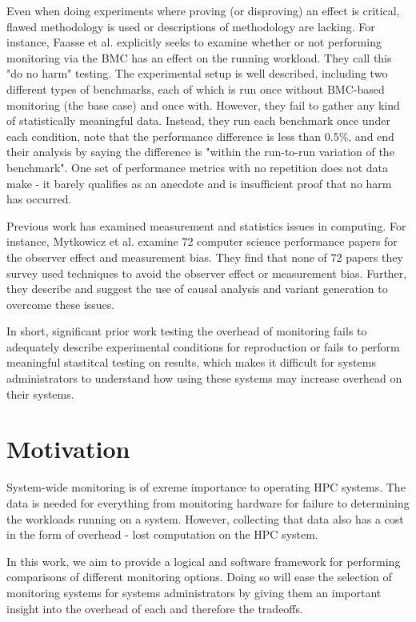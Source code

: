 \documentclass[conference]{IEEEtran}
\begin{document}
Even when doing experiments where proving (or disproving) an effect is critical, 
flawed methodology is used or descriptions of methodology are lacking. For 
instance, Faasse et al. \cite{faasseOutBandPerformance2020} explicitly seeks to examine 
whether or not performing monitoring via the BMC has an effect on the running 
workload. They call this "do no harm" testing. The experimental setup is well
described, including two different types of benchmarks, each of which is run 
once without BMC-based monitoring (the base case) and once with. However, they 
fail to gather any kind of statistically meaningful data. Instead, they run 
each benchmark once under each condition, note that the performance difference 
is less than 0.5\%, and end their analysis by saying the difference is
"within the run-to-run variation of the benchmark". One set of performance 
metrics with no repetition does not data make - it barely qualifies as an 
anecdote and is insufficient proof that no harm has occurred.

Previous work has examined measurement and statistics issues in computing. For 
instance, Mytkowicz et al. \cite{mytkowiczObserverEffectMeasurement2008} examine
72 computer science performance papers for the observer effect and measurement bias.
They find that none of 72 papers they survey used techniques to avoid the observer 
effect or measurement bias. Further, they describe and suggest the use of causal
analysis and variant generation to overcome these issues.

In short, significant prior work testing the overhead of monitoring fails to 
adequately describe experimental conditions for reproduction or fails to 
perform meaningful stastitcal testing on results, which makes it difficult for 
systems administrators to understand how using these systems may increase 
overhead on their systems.

\section{Motivation} \label{motivation}

System-wide monitoring is of exreme importance to operating HPC systems. The data 
is needed for everything from monitoring hardware for failure to determining the 
workloads running on a system. However, collecting that data also has a 
cost in the form of overhead - lost computation on the HPC system.

In this work, we aim to provide 
a logical and software framework for performing comparisons of different 
monitoring options. Doing so will ease the selection of monitoring systems 
for systems administrators 
by giving them an important insight into the overhead of each and therefore the 
tradeoffs.
\end{document}
